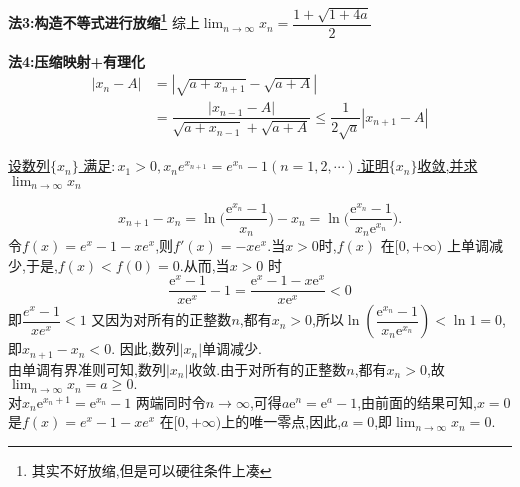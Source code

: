 \documentclass[8pt a4paper, oneside, UTF8]{ctexbook}
\begin{document}
\begin{sloppypar}
\begin{solution}{\textbf{法3:构造不等式进行放缩\footnote{其实不好放缩,但是可以硬往条件上凑}}}
        综上$\lim_{n\to \infty}x_n=\dfrac{1+\sqrt{1+4a}}{2}$
    \end{solution}
    \begin{solution}{\textbf{法4:压缩映射+有理化}}
        \begin{align*}
            |x_n -A| & = |\sqrt{a+x_{n+1}}-\sqrt{a+A}|                                                              \\
                     & = \dfrac{|x_{n-1}-A|}{\sqrt{a+x_{n-1}}+\sqrt{a+A}} \leqslant \dfrac{1}{2\sqrt{a}}|x_{n+1}-A|
        \end{align*}
    \end{solution}
    \begin{problem}
    \uline{设数列$\{x_n\}$ 满足$:x_1>0,x_ne^{x_{n+1}}=e^{x_n}-1(n=1,2,\cdots)$.证明$\{x_n\}$收敛,并求$\lim_{n\to\infty} x_n$ }
    \end{problem}
    \begin{solution}
        $$
            x_{n+1} - x_{n} = \ln\biggl(\frac{\mathrm{e}^{x_{n}} - 1}{x_{n}}\biggr)- x_{n} = \ln\biggl(\frac{\mathrm{e}^{x_{n}} - 1}{x_{n}\mathrm{e}^{x_{n}}}\biggr).
        $$
        令$f(x)=e^x-1-xe^x$,则$f'(x)=-xe^x$.当$x>0$时,$f(x)$ 在$[0,+\infty)$ 上单调减少,于是,$f(x)<f\left(0\right)=0.$从而,当$x>0$ 时
        $$
            \dfrac{\mathrm{e}^x-1}{x\mathrm{e}^x}-1 = \dfrac{\mathrm{e}^x-1-x\mathrm{e}^x}{x\mathrm{e}^x}<0
        $$即$\dfrac{e^x-1}{xe^x}<1$
        又因为对所有的正整数$n$,都有$x_n>0$,所以$\ln\left(\dfrac{\mathrm{e}^{x_n}-1}{x_n\mathrm{e}^{x_n}}\right)<\ln1=0$,即$x_{n+1}-x_n<0.$ 因此,数列$|x_n|$单调减少.\\
        由单调有界准则可知,数列$|x_n|$收敛.由于对所有的正整数$n$,都有$x_n>0$,故$\lim_{n\to\infty}x_n=a\geqslant0.$\\
        对$x_n\mathrm{e}^{x_n+1}=\mathrm{e}^{x_n}-1$ 两端同时令$n\to\infty$,可得$a\mathrm{e}^n=\mathrm{e}^a-1$,由前面的结果可知,$x=0$ 是$f(x)=e^x-1-xe^x$ 在$[0,+\infty)$上的唯一零点,因此,$a=0$,即$\lim_{n\to \infty}x_n=0.$
    \end{solution}
    \ifx\allfiles\undefined
\end{sloppypar}
\end{document}
